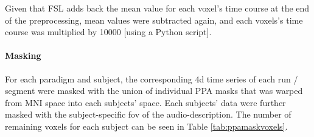 
%
Given that FSL adds back the mean value for each voxel's time course at the end
of the preprocessing, mean values were subtracted again, and each voxels's time
course was multiplied by 10000 [using a Python script].


\paragraph{Masking}









For each paradigm and subject, the corresponding 4d time series of each run /
segment were masked with the union of individual PPA masks
\citep[s.][]{haeusler2022processing} that was warped from MNI space into each
subjects' space.
Each subjects' data were further masked with the subject-specific \ac{fov} of
the audio-description.
%
The number of remaining voxels for each subject can be seen in Table
\ref{tab:ppamaskvoxels}.


